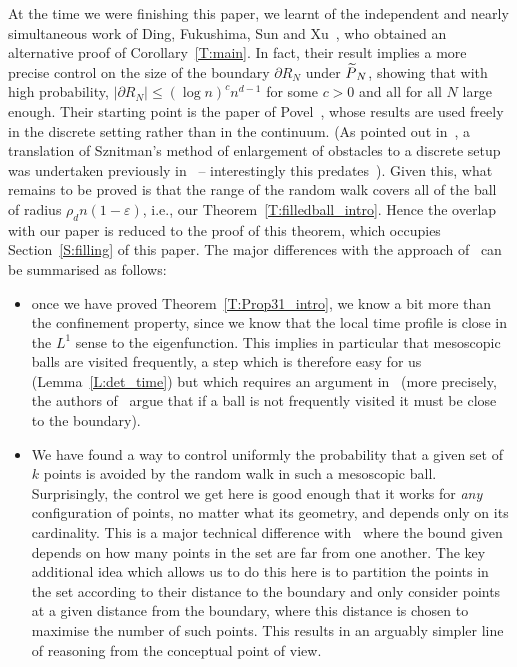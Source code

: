 \documentclass[AHL, Unicode, longabstracts, published]{cedram}
\newcommand*\eps{\varepsilon}
\let\oldtilde\tilde
\renewcommand*{\tilde}[1]{\mathchoice{\widetilde{#1}}{\widetilde{#1}}{\oldtilde{#1}}{\oldtilde{#1}}}\let\oldhat\hat
\renewcommand*{\hat}[1]{\mathchoice{\widehat{#1}}{\widehat{#1}}{\oldhat{#1}}{\oldhat{#1}}}\let\oldexists\exists
\renewcommand*{\exists}{\mathrel{\oldexists}}
\begin{document}
At the time we were finishing this paper, we learnt of the independent and nearly simultaneous work of Ding, Fukushima, Sun and Xu~\cite{DFSX}, who obtained an alternative proof of Corollary~\ref{T:main}. In fact, their result implies a more precise control on the size of the boundary $\partial R_N$ under $\tilde P_N$, showing that with high probability, $|\partial R_N| \le (\log n)^c n^{d-1}$ for some $c>0$ and all for all $N$ large enough. Their starting point is the paper of Povel~\cite{Povel}, whose results are used freely in the discrete setting rather than in the continuum. (As pointed out in~\cite{DFSX}, a translation of Sznitman's method of enlargement of obstacles to a discrete setup was undertaken previously in~\cite{Antal} -- interestingly this predates~\cite{Povel}). Given this, what remains to be proved is that the range of the random walk covers all of the ball of radius $\rho_d n (1- \eps)$, i.e., our Theorem~\ref{T:filledball_intro}. Hence the overlap with our paper is reduced to the proof of this theorem, which occupies Section~\ref{S:filling} of this paper. The major differences with the approach of~\cite{DFSX} can be summarised as follows:
\begin{itemize}
\item[--] once we have proved Theorem~\ref{T:Prop31_intro}, we know a bit more than the confinement property, since we know that the local time profile is close in the $L^1$ sense to the eigenfunction. This implies in particular that mesoscopic balls are visited frequently, a step which is therefore easy for us (Lemma~\ref{L:det_time}) but which requires an argument in~\cite{DFSX} (more precisely, the authors of~\cite{DFSX} argue that if a ball is not frequently visited it must be close to the boundary).
\goodbreak


\item[--] We have found a way to control uniformly the probability that a given set of $k$ points is avoided by the random walk in such a mesoscopic ball. Surprisingly, the control we get here is good enough that it works for \emph{any} configuration of points, no matter what its geometry, and depends only on its cardinality. This is a major technical difference with~\cite{DFSX} where the bound given depends on how many points in the set are far from one another. The key additional idea which allows us to do this here is to partition the points in the set according to their distance to the boundary and only consider points at a given distance from the boundary, where this distance is chosen to maximise the number of such points. This results in an arguably simpler line of reasoning from the conceptual point of view.
\end{itemize}
\end{document}
